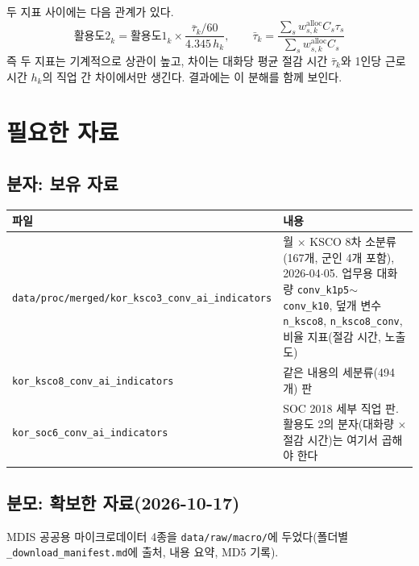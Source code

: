 \documentclass[11pt]{article}
\begin{document}
두 지표 사이에는 다음 관계가 있다.
\[
\text{활용도2}_{k} = \text{활용도1}_{k} \times \frac{\bar\tau_k / 60}{4.345\, h_k},
\qquad \bar\tau_k = \frac{\sum_s w^{\text{alloc}}_{s,k} C_s \tau_s}{\sum_s w^{\text{alloc}}_{s,k} C_s}
\]
즉 두 지표는 기계적으로 상관이 높고, 차이는 대화당 평균 절감 시간 $\bar\tau_k$와 1인당 근로시간 $h_k$의 직업 간 차이에서만 생긴다. 결과에는 이 분해를 함께 보인다.

\section{필요한 자료}

\subsection{분자: 보유 자료}

\begin{longtable}{L{5.2cm}L{10.6cm}}
\toprule
파일 & 내용 \\
\midrule
\endhead
\texttt{data/proc/merged/kor\_ksco3\_conv\_ai\_indicators} & 월 $\times$ KSCO 8차 소분류(167개, 군인 4개 포함), 2026-04$\cdot$05. 업무용 대화량 \texttt{conv\_k1p5}$\sim$\texttt{conv\_k10}, 덮개 변수 \texttt{n\_ksco8}, \texttt{n\_ksco8\_conv}, 비율 지표(절감 시간, 노출도) \\
\texttt{kor\_ksco8\_conv\_ai\_indicators} & 같은 내용의 세분류(494개) 판 \\
\texttt{kor\_soc6\_conv\_ai\_indicators} & SOC 2018 세부 직업 판. 활용도 2의 분자(대화량 $\times$ 절감 시간)는 여기서 곱해야 한다 \\
\bottomrule
\end{longtable}

\subsection{분모: 확보한 자료(2026-10-17)}

MDIS 공공용 마이크로데이터 4종을 \texttt{data/raw/macro/}에 두었다(폴더별 \texttt{\_download\_manifest.md}에 출처, 내용 요약, MD5 기록).
\end{document}
